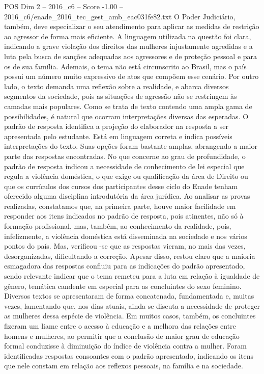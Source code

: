 \begin{textsample}{POS Dim 2 – 2016\_c6 – Score -1.00 – 2016\_c6/enade\_2016\_tec\_gest\_amb\_eac031fe82.txt}
O Poder Judiciário, também, deve especializar o seu atendimento para aplicar as medidas de restrição ao agressor de forma mais eficiente.
A linguagem utilizada na questão foi clara, indicando a grave violação dos direitos das mulheres injustamente agredidas e a luta pela busca de sanções adequadas aos agressores e de proteção pessoal e para os de sua família.
Ademais, o tema não está circunscrito ao Brasil, mas o país possui um número muito expressivo de atos que compõem esse cenário.
Por outro lado, o texto demanda uma reflexão sobre a realidade, e abarca diversos segmentos da sociedade, pois as situações de agressão não se restringem às camadas mais populares.
Como se trata de texto contendo uma ampla gama de possibilidades, é natural que ocorram interpretações diversas das esperadas.
O padrão de resposta identifica a projeção do elaborador na resposta a ser apresentada pelo estudante.
Está em linguagem correta e indica possíveis interpretações do texto.
Suas opções foram bastante amplas, abrangendo a maior parte das respostas encontradas.
No que concerne ao grau de profundidade, o padrão de resposta indicou a necessidade de conhecimento de lei especial que regula a violência doméstica, o que exige ou qualificação da área de Direito ou que os currículos dos cursos dos participantes desse ciclo do Enade tenham oferecido alguma disciplina introdutória da área jurídica.
Ao analisar as provas realizadas, constatamos que, na primeira parte, houve maior facilidade em responder aos itens indicados no padrão de resposta, pois atinentes, não só à formação profissional, mas, também, ao conhecimento da realidade, pois, infelizmente, a violência doméstica está disseminada na sociedade e nos vários pontos do país.
Mas, verificou -se que as respostas vieram, no mais das vezes, desorganizadas, dificultando a correção.
Apesar disso, restou claro que a maioria esmagadora das respostas confluiu para as indicações do padrão apresentado, sendo relevante indicar que o tema remeteu para a luta em relação à igualdade de gênero, temática candente em especial para as concluintes do sexo feminino.
Diversos textos se apresentaram de forma concatenada, fundamentada e, muitas vezes, lamentando que, nos dias atuais, ainda se discuta a necessidade de proteger as mulheres dessa espécie de violência.
Em muitos casos, também, os concluintes fizeram um liame entre o acesso à educação e a melhora das relações entre homens e mulheres, ao permitir que a conclusão de maior grau de educação formal conduzisse à diminuição do índice de violência contra a mulher.
Foram identificadas respostas consoantes com o padrão apresentado, indicando os itens que nele constam em relação aos reflexos pessoais, na família e na sociedade.

\end{textsample}
